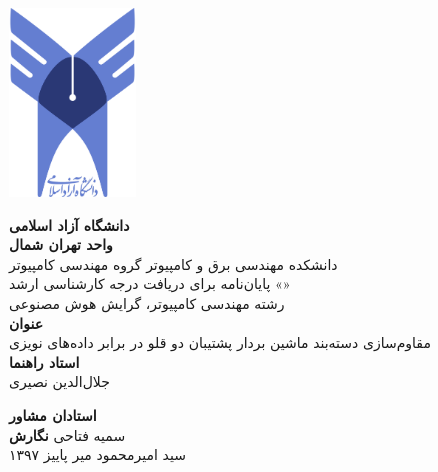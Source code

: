 \thispagestyle{empty}

\centerline{\includegraphics[height=5cm]{logo.png}}

\begin{center}
\vspace{0.5cm}

\textbf{دانشگاه آزاد اسلامی}
\\[.2cm]
\textbf{واحد تهران شمال}
\\[0.5cm]

دانشکده مهندسی برق و کامپیوتر گروه مهندسی کامپیوتر
\\[.5cm]
پایان‌نامه برای دریافت درجه کارشناسی ارشد «»
\\[.2cm]
رشته مهندسی کامپیوتر، گرایش هوش مصنوعی
\\[0.5cm]

{\Large
\textbf{عنوان}
}
\\
مقاوم‌سازی دسته‌بند ماشین بردار پشتیبان دو قلو در برابر داده‌های نویزی
\\[0.5cm]

{\Large
	\textbf{استاد راهنما}
}
\\
جلال‌ا‌لدین نصیری
\vskip 0.5cm

{\Large
	\textbf{استادان مشاور}
}
\\
سمیه فتاحی
\vskip 0.5cm
{\Large
	\textbf{نگارش}
}
\\
سید امیرمحمود میر
\vskip 0.5cm
پاییز ۱۳۹۷
\end{center}